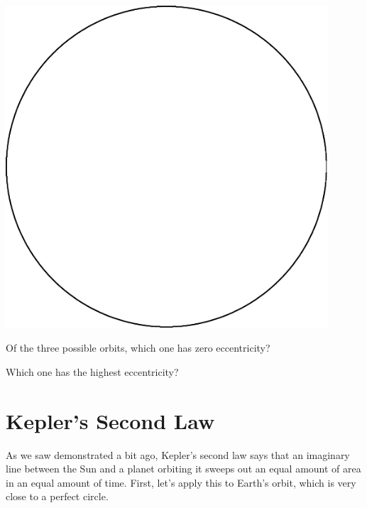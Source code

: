 \documentclass[12pt]{article}
\begin{document}
\begin{minipage}{0.25\textwidth}
	\begin{center}
		\includegraphics[width=0.9\textwidth]{circle-crop.pdf}
	\end{center}
\end{minipage}

Of the three possible orbits, which one has zero eccentricity? 

\vspace{0.8in}

Which one has the highest eccentricity?

\newpage


\section{Kepler's Second Law}

As we saw demonstrated a bit ago, Kepler's second law says that an imaginary line between the Sun and a planet orbiting it sweeps out an equal amount of area in an equal amount of time. First, let's apply this to Earth's orbit, which is very close to a perfect circle.
\end{document}

